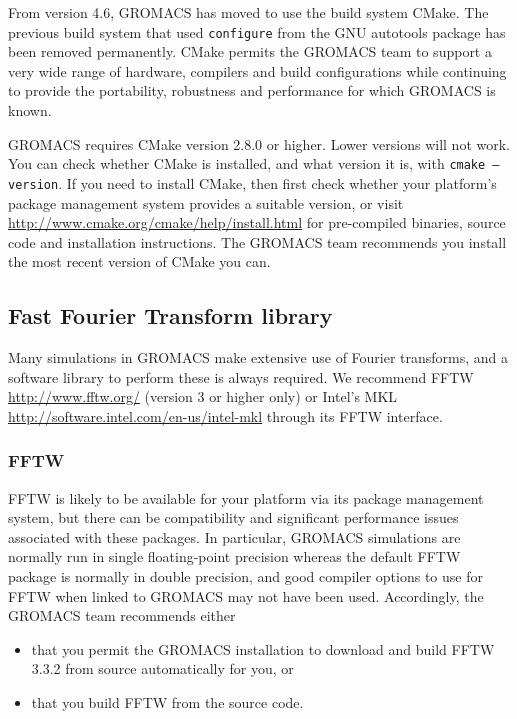 \documentclass{article}[12pt,a4paper,twoside]
\newcommand{\gromacs}{GROMACS}
\newcommand{\fftw}{FFTW}
\newcommand{\mkl}{MKL}
\newcommand{\cmake}{CMake}
\newcommand{\fftwversion}{3.3.2}
\newcommand{\cmakeversion}{2.8.0}
\begin{document}
From version 4.6, \gromacs{} has moved to use the build system
\cmake{}. The previous build system that used \texttt{configure} from
the GNU autotools package has been removed permanently. \cmake{}
permits the \gromacs{} team to support a very wide range of hardware,
compilers and build configurations while continuing to provide the
portability, robustness and performance for which \gromacs{} is known.

\gromacs{} requires \cmake{} version \cmakeversion{} or higher. Lower
versions will not work. You can check whether \cmake{} is installed,
and what version it is, with \texttt{cmake --version}. If you need to
install \cmake{}, then first check whether your platform's package
management system provides a suitable version, or visit
\url{http://www.cmake.org/cmake/help/install.html} for pre-compiled
binaries, source code and installation instructions. The \gromacs{}
team recommends you install the most recent version of \cmake{} you
can.

\subsection{Fast Fourier Transform library}

Many simulations in \gromacs{} make extensive use of Fourier transforms,
and a software library to perform these is always required. We
recommend \fftw{} \url{http://www.fftw.org/} (version 3 or higher
only) or Intel's \mkl{}
\url{http://software.intel.com/en-us/intel-mkl} through its \fftw{} interface.

\subsubsection{\fftw{}}

\fftw{} is likely to be available for your platform via its package
management system, but there can be compatibility and significant
performance issues associated with these packages. In particular,
\gromacs{} simulations are normally run in single floating-point
precision whereas the default \fftw{} package is normally in double
precision, and good compiler options to use for \fftw{} when linked to
\gromacs{} may not have been used. Accordingly, the \gromacs{} team
recommends either
\begin{itemize}
\item that you permit the \gromacs{} installation to download and
  build \fftw{} \fftwversion{} from source automatically
  for you, or
\item that you build \fftw{} from the source code.
\end{itemize}
\end{document}
